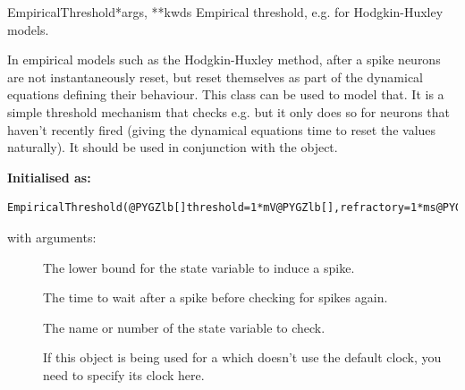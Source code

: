\documentclass[letterpaper,10pt,english]{manual}
\begin{document}
\hypertarget{brian.EmpiricalThreshold}{}\begin{classdesc}{EmpiricalThreshold}{*args, **kwds}
Empirical threshold, e.g. for Hodgkin-Huxley models.

In empirical models such as the Hodgkin-Huxley method, after a spike
neurons are not instantaneously reset, but reset themselves
as part of the dynamical equations defining their behaviour. This class
can be used to model that. It is a simple threshold mechanism that
checks e.g.  but it only does so for neurons that haven't
recently fired (giving the dynamical equations time to reset
the values naturally). It should be used in conjunction with the
\hyperlink{brian.NoReset}{} object.

\textbf{Initialised as:}

\begin{Verbatim}[commandchars=@\[\]]
EmpiricalThreshold(@PYGZlb[]threshold=1*mV@PYGZlb[],refractory=1*ms@PYGZlb[],state=0@PYGZlb[],clock@PYGZrb[]@PYGZrb[]@PYGZrb[]@PYGZrb[])
\end{Verbatim}

with arguments:
\begin{description}
\item[]
The lower bound for the state variable to induce a spike.

\item[]
The time to wait after a spike before checking for spikes again.

\item[]
The name or number of the state variable to check.

\item[]
If this object is being used for a \hyperlink{brian.NeuronGroup}{} which doesn't
use the default clock, you need to specify its clock here.

\end{description}
\end{classdesc}
\end{document}
